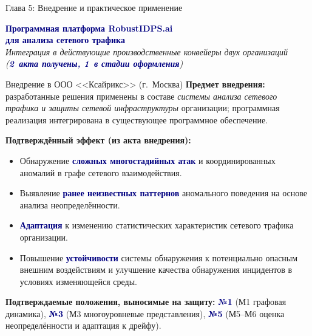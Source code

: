 \documentclass[10pt,aspectratio=169]{beamer}
\newcommand{\bn}[1]{\textcolor{navy}{\textbf{#1}}}
\begin{document}
\begin{frame}{Глава 5: Внедрение и практическое применение}
\vspace{1.5cm}
\begin{center}
{\Large\bn{Программная платформа RobustIDPS.ai\\
для анализа сетевого трафика}}\\[1cm]

\textit{Интеграция в действующие производственные конвейеры
двух организаций (\bn{2~акта получены, 1~в стадии оформления})}
\end{center}
\end{frame}

\begin{frame}{Внедрение в ООО <<Ксайрикс>> (г.~Москва)}
\small
\textbf{Предмет внедрения:} разработанные решения применены в
составе \emph{системы анализа сетевого трафика и защиты сетевой
инфраструктуры} организации; программная реализация
интегрирована в существующее программное обеспечение.
\smallskip

\textbf{Подтверждённый эффект (из акта внедрения):}
\begin{itemize}\setlength\itemsep{0pt}
\item Обнаружение \bn{сложных многостадийных атак} и
координированных аномалий в графе сетевого взаимодействия.
\item Выявление \bn{ранее неизвестных паттернов} аномального
поведения на основе анализа неопределённости.
\item \bn{Адаптация} к изменению статистических характеристик
сетевого трафика организации.
\item Повышение \bn{устойчивости} системы обнаружения к
потенциально опасным внешним воздействиям и улучшение
качества обнаружения инцидентов в условиях изменяющейся
среды.
\end{itemize}
\smallskip

\textbf{Подтверждаемые положения, выносимые на защиту:}
\bn{№1} (М1 графовая динамика), \bn{№3} (М3 многоуровневые
представления), \bn{№5} (М5--М6 оценка неопределённости и
адаптация к дрейфу).
\end{frame}
\end{document}
